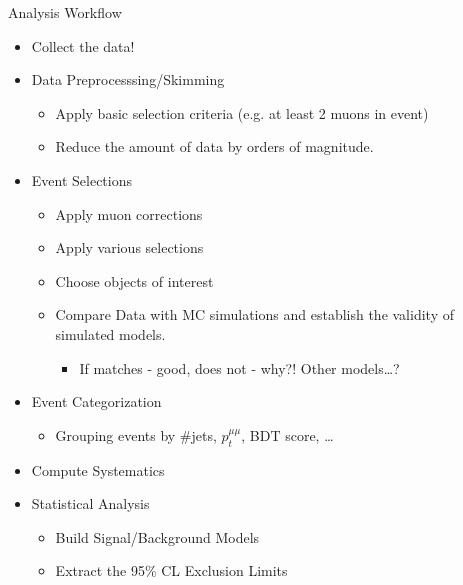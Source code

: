\documentclass[pdf, 9pt]{beamer}
\begin{document}
  \begin{frame}{Analysis Workflow}
    \begin{itemize}
      \item \alert{Collect the data!}
      \item Data Preprocesssing/Skimming
        \begin{itemize}
          \item Apply basic selection criteria (e.g. at least 2 muons in event)
          \item Reduce the amount of data by orders of magnitude.
        \end{itemize}
      \item Event Selections
        \begin{itemize}
          \item Apply muon corrections
          \item Apply various selections
          \item Choose objects of interest
          \item Compare Data with MC simulations and establish the validity of simulated models.
            \begin{itemize}
              \item If matches - good, does not - why?! Other models\dots ?
            \end{itemize}
        \end{itemize}
      \item Event Categorization
        \begin{itemize}
          \item Grouping events by \#jets, $p_{t}^{\mu\mu}$, BDT score, \dots
        \end{itemize}
      \item Compute Systematics
      \item Statistical Analysis
          \begin{itemize}
            \item Build Signal/Background Models
            \item Extract the 95\% CL Exclusion Limits
          \end{itemize}
    \end{itemize}
  \end{frame}
\end{document}
